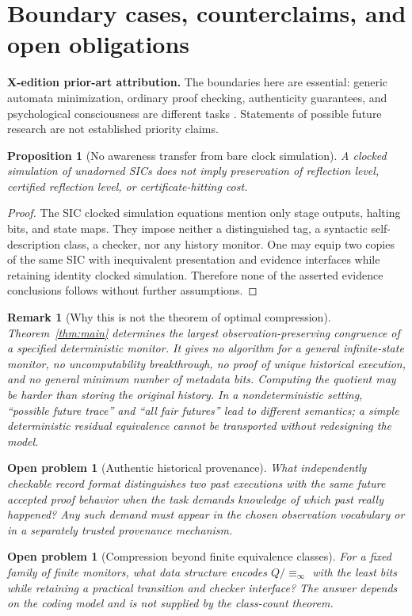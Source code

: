 \documentclass[11pt,letterpaper]{article}
\newcommand{\PriorArtNote}[1]{%
\par\smallskip\noindent\begin{minipage}{\linewidth}\small\color{black!85}%
\textbf{X-edition prior-art attribution.} #1\end{minipage}\par\smallskip}
\newtheorem{proposition}[theorem]{Proposition}
\newtheorem{remark}[theorem]{Remark}
\newtheorem{problem}[theorem]{Open problem}
\newcommand{\Rinf}{\equiv_{\!\infty}}
\begin{document}
\section{Boundary cases, counterclaims, and open obligations}
\PriorArtNote{The boundaries here are essential: generic automata minimization, ordinary proof checking, authenticity guarantees, and psychological consciousness are different tasks \cite{nerode,necula,tegmark}. Statements of possible future research are not established priority claims.}
\begin{proposition}[No awareness transfer from bare clock simulation]\label{prop:nobare}
A clocked simulation of unadorned SICs does not imply preservation of reflection level, certified reflection level, or certificate-hitting cost.
\end{proposition}
\begin{proof}
The SIC clocked simulation equations mention only stage outputs, halting bits, and state maps. They impose neither a distinguished tag, a syntactic self-description class, a checker, nor any history monitor. One may equip two copies of the same SIC with inequivalent presentation and evidence interfaces while retaining identity clocked simulation. Therefore none of the asserted evidence conclusions follows without further assumptions.
\end{proof}
\begin{remark}[Why this is not the theorem of optimal compression]
Theorem~\ref{thm:main} determines the largest observation-preserving congruence of a \emph{specified deterministic monitor}. It gives no algorithm for a general infinite-state monitor, no uncomputability breakthrough, no proof of unique historical execution, and no general minimum number of metadata bits. Computing the quotient may be harder than storing the original history. In a nondeterministic setting, ``possible future trace'' and ``all fair futures'' lead to different semantics; a simple deterministic residual equivalence cannot be transported without redesigning the model.
\end{remark}
\begin{problem}[Authentic historical provenance]
What independently checkable record format distinguishes two past executions with the same future accepted proof behavior when the task demands knowledge of \emph{which past really happened}? Any such demand must appear in the chosen observation vocabulary or in a separately trusted provenance mechanism.
\end{problem}
\begin{problem}[Compression beyond finite equivalence classes]
For a fixed family of finite monitors, what data structure encodes $Q/\Rinf$ with the least bits while retaining a practical transition and checker interface? The answer depends on the coding model and is not supplied by the class-count theorem.
\end{problem}
\end{document}
